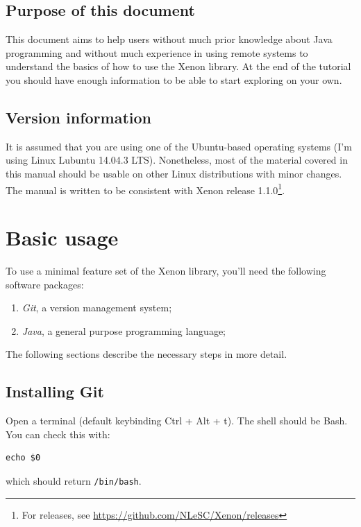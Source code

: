 \documentclass[12pt, a4paper, twoside, openany, titlepage]{book}
\begin{document}
\section{Purpose of this document}

This document aims to help users without much prior knowledge about Java programming and without much experience in using remote systems to understand the basics of how to use the Xenon library. At the end of the tutorial you should have enough information to be able to start exploring on your own.

\section{Version information}

It is assumed that you are using one of the Ubuntu-based operating systems (I'm using Linux Lubuntu 14.04.3 LTS). Nonetheless, most of the material covered in this manual should be usable on other Linux distributions with minor changes. The manual is written to be consistent with Xenon release 1.1.0\footnote{For releases, see \url{https://github.com/NLeSC/Xenon/releases}}.






\chapter{Basic usage}

To use a minimal feature set of the Xenon library, you'll need the following software packages:
\begin{enumerate}
\item{\textit{Git}, a version management system;}
\item{\textit{Java}, a general purpose programming language;}
\end{enumerate}


The following sections describe the necessary steps in more detail.




\section{Installing Git}

Open a terminal (default keybinding Ctrl + Alt + t). The shell should be Bash. You can check this with:
\begin{lstlisting}[style=basic,style=bash]
echo $0
\end{lstlisting} %
which should return \texttt{/bin/bash}.
\end{document}
